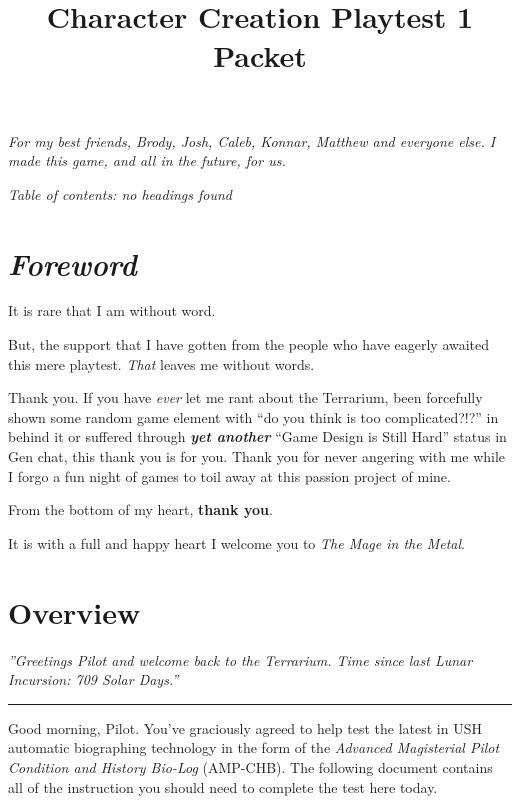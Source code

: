 \documentclass[
]{article}
\title{Character Creation Playtest 1 Packet}
\author{}
\date{}
\begin{document}
\maketitle

\emph{For my best friends, Brody, Josh, Caleb, Konnar, Matthew and
everyone else. I made this game, and all in the future, for us.}

\emph{Table of contents: no headings found}

\hypertarget{foreword}{%
\section{\texorpdfstring{\emph{Foreword}}{Foreword}}\label{foreword}}

It is rare that I am without word.

But, the support that I have gotten from the people who have eagerly
awaited this mere playtest. \emph{That} leaves me without words.

Thank you. If you have \emph{ever} let me rant about the Terrarium, been
forcefully shown some random game element with ``do you think is too
complicated?!?'' in behind it or suffered through \textbf{\emph{yet
another}} ``Game Design is Still Hard'' status in Gen chat, this thank
you is for you. Thank you for never angering with me while I forgo a fun
night of games to toil away at this passion project of mine.

From the bottom of my heart, \textbf{thank you}.

It is with a full and happy heart I welcome you to {{\emph{The Mage in
the Metal}}}.

\hypertarget{overview}{%
\section{Overview}\label{overview}}

\emph{''Greetings Pilot and welcome back to the Terrarium. Time since
last Lunar Incursion: 709 Solar Days.''}

\begin{center}\rule{0.5\linewidth}{0.5pt}\end{center}

Good morning, Pilot. You've graciously agreed to help test the latest in
USH automatic biographing technology in the form of the \emph{Advanced
Magisterial Pilot Condition and History Bio-Log} (AMP-CHB). The
following document contains all of the instruction you should need to
complete the test here today.
\end{document}
